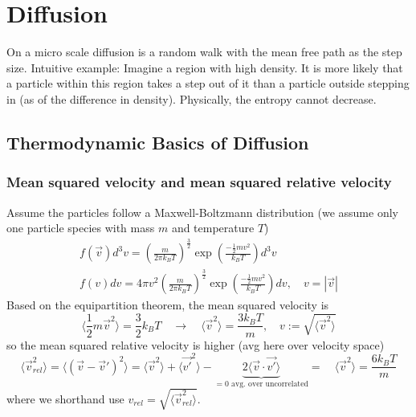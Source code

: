 \section{Diffusion}
\thispagestyle{plain}

On a micro scale diffusion is a random walk with the mean free path as the step size.
\textcolor{blue1}{Intuitive example}: Imagine a region with high density. It is more likely that a particle
within this region takes a step out of it than a particle outside stepping in (as of the 
difference in density). Physically, the entropy cannot decrease.

\subsection{Thermodynamic Basics of Diffusion}
\subsubsection{Mean squared velocity and mean squared relative velocity}
Assume the particles follow a Maxwell-Boltzmann distribution (we assume only one particle species with mass $m$ and temperature $T$)
\begin{equation}
    \begin{gathered}
    f(\vec{v}) d^3 v=\left(\frac{m}{2 \pi k_B T}\right)^{\frac{3}{2}} \exp \left(\frac{-\frac{1}{2} m v^2}{k_B T}\right) d^3 v \\
    f(v) d v=4 \pi v^2\left(\frac{m}{2 \pi k_B T}\right)^{\frac{3}{2}} \exp \left(\frac{-\frac{1}{2} m v^2}{k_B T}\right) d v, \quad v=|\vec{v}|
    \end{gathered}
\end{equation}
Based on the equipartition theorem, the mean squared velocity is
\begin{equation}
    \langle \frac{1}{2} m \vec{v}^2 \rangle = \frac{3}{2} k_B T \quad \rightarrow \quad \langle \vec{v}^2 \rangle = \frac{3k_B T}{m},  \quad v:= \sqrt{\langle \vec{v}^2 \rangle}
\end{equation}
so the mean squared relative velocity is higher (avg here over velocity space)
\begin{equation}
    \langle \vec{v}_{rel}^2 \rangle = \langle (\vec{v} - \vec{v}')^2 \rangle = \langle \vec{v}^2 \rangle + \langle \vec{v'}^2 \rangle - \underbrace{2 \langle \vec{v} \cdot \vec{v'} \rangle}_{=0 \text{ avg. over uncorrelated}} = \quad \langle \vec{v}^2 \rangle = \frac{6 k_B T}{m}
\end{equation}
where we shorthand use $v_{rel} = \sqrt{\langle \vec{v}_{rel}^2 \rangle}$.

